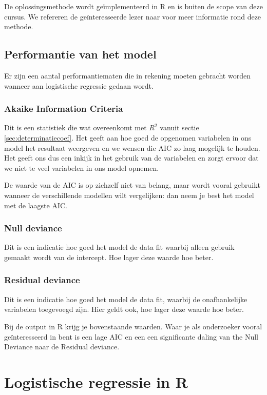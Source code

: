 De oplossingsmethode wordt ge\"implementeerd in R en is buiten de scope van deze cursus. We refereren de ge\"interesseerde lezer naar \cite{Hastie2009} voor meer informatie rond deze methode. 


\subsection{Performantie van het model}
Er zijn een aantal performantiematen die in rekening moeten gebracht worden wanneer aan logistische regressie gedaan wordt. 

\subsubsection{Akaike Information Criteria}
Dit is een statistiek die wat overeenkomt met $R^2$ vanuit sectie \ref{sec:determinatiecoef}. Het geeft aan hoe goed de opgenomen variabelen in ons model het resultaat weergeven en we wensen die AIC zo laag mogelijk te houden. Het geeft ons dus een inkijk in het gebruik van de variabelen en zorgt ervoor dat we niet te veel variabelen in ons model opnemen. 

De waarde van de AIC is op zichzelf niet van belang, maar wordt vooral gebruikt wanneer de verschillende modellen wilt vergelijken: dan neem je best het model met de laagste AIC. 

\subsubsection{Null deviance}
Dit is een indicatie hoe goed het model de data fit waarbij alleen gebruik gemaakt wordt van de intercept. Hoe lager deze waarde hoe beter.

\subsubsection{Residual deviance}
Dit is een indicatie hoe goed het model de data fit, waarbij de onafhankelijke variabelen toegevoegd zijn. Hier geldt ook, hoe lager deze waarde hoe beter.

Bij de output in R krijg je bovenstaande waarden. Waar je als onderzoeker vooral ge\"interesseerd in bent is een lage AIC en een een significante daling van the Null Deviance naar de Residual deviance. 


\section{Logistische regressie in R}

